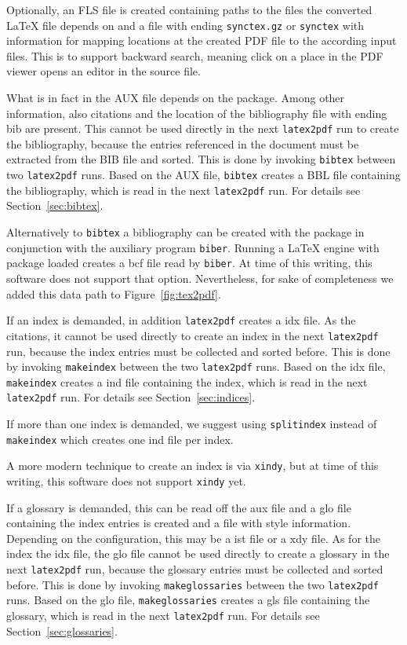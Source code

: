 Optionally, an FLS file is created containing paths to the files 
the converted \LaTeX{} file depends on 
and a file with ending \texttt{synctex.gz} or \texttt{synctex} 
with information for mapping locations at the created PDF file 
to the according input files. 
This is to support backward search, meaning click on a place in the PDF viewer 
opens an editor in the source file. 

What is in fact in the AUX file depends on the package. 
Among other information, 
also citations and the location of the bibliography file with ending bib 
are present. 
This cannot be used directly in the next \texttt{latex2pdf} run 
to create the bibliography, 
because the entries referenced in the document must be extracted from the BIB file 
and sorted. 
This is done by invoking \texttt{bibtex} between two \texttt{latex2pdf} runs. 
Based on the AUX file, \texttt{bibtex} creates a BBL file 
containing the bibliography, which is read in the next \texttt{latex2pdf} run. 
For details see Section~\ref{sec:bibtex}. 

Alternatively to \texttt{bibtex} a bibliography can be created 
with the package  in conjunction with the auxiliary program \texttt{biber}. 
Running a \LaTeX{} engine with package  loaded 
creates a \gls{bcf} file read by \texttt{biber}. 
At time of this writing, this software does not support that option. 
Nevertheless, for sake of completeness we added this data path to Figure~\ref{fig:tex2pdf}. 

If an index is demanded, 
in addition \texttt{latex2pdf} creates a \gls{idx} file. 
As the citations, it cannot be used directly to create an index in
the next \texttt{latex2pdf} run, 
because the index entries must be collected and sorted before. 
This is done by invoking \texttt{makeindex} 
between the two \texttt{latex2pdf} runs. 
Based on the \gls{idx} file, \texttt{makeindex} creates a \gls{ind} file 
containing the index, which is read in the next \texttt{latex2pdf} run. 
For details see Section~\ref{sec:indices}. 

If more than one index is demanded, 
we suggest using \texttt{splitindex} instead of \texttt{makeindex} 
which creates one \gls{ind} file per index. 

A more modern technique to create an index is via \texttt{xindy}, 
but at time of this writing, this software does not support \texttt{xindy} yet. 

If a glossary is demanded, this can be read off the \gls{aux} file 
and a \gls{glo} file containing the index entries 
is created and a file with style information. 
Depending on the configuration, 
this may be a \gls{ist} file or a \gls{xdy} file. 
As for the index the \gls{idx} file, 
the \gls{glo} file cannot be used directly to create a glossary in
the next \texttt{latex2pdf} run, 
because the glossary entries must be collected and sorted before. 
This is done by invoking \texttt{makeglossaries} 
between the two \texttt{latex2pdf} runs. 
Based on the \gls{glo} file, \texttt{makeglossaries} creates a \gls{gls} file 
containing the glossary, which is read in the next \texttt{latex2pdf} run. 
For details see Section~\ref{sec:glossaries}. 

